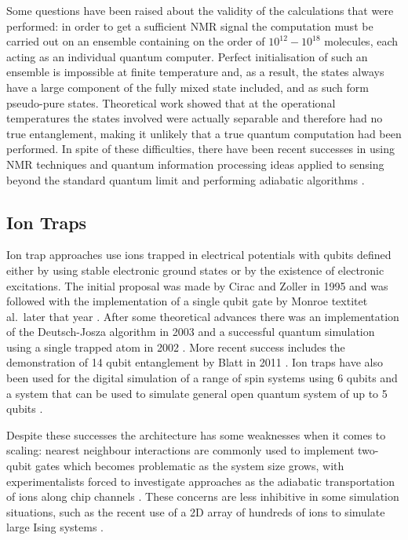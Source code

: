 Some questions have been raised about the validity of the calculations that were performed: in order to get a sufficient NMR signal the computation must be carried out on an ensemble containing on the order of $10^{12} − 10^{18}$ molecules, each acting as an individual quantum computer. Perfect initialisation of such an ensemble is impossible at finite temperature and, as a result, the states always have a large component of the fully mixed state included, and as such form pseudo-pure states. Theoretical work \cite{nmr_pseudo_pure} showed that at the operational temperatures the states involved were actually separable and therefore had no true entanglement, making it unlikely that a true quantum computation had been performed. In spite of these difficulties, there have been recent successes in using NMR techniques and quantum information processing ideas applied to sensing beyond the standard quantum limit \cite{nmr_sensing_09} and performing adiabatic algorithms \cite{nmr_143_factorization}.

\subsection{Ion Traps}

Ion trap approaches use ions trapped in electrical potentials with qubits defined either by using stable electronic ground states or by the existence of electronic excitations. The initial proposal was made by Cirac and Zoller in 1995 \cite{cirac_zoller_ion_trap_proposal_95} and was followed with the implementation of a single qubit gate by Monroe textit{et al}.\ later that year \cite{monroe_ion_trap_gate_95}. After some theoretical advances  \cite{first_ion_trap_wineland_98} there was an implementation of the Deutsch-Josza algorithm in 2003 \cite{ion_trap_deutsch_jozsa_03} and a successful quantum simulation using a single trapped atom in 2002 \cite{ion_trap_simulator_02}. More recent success includes the demonstration of 14 qubit entanglement by Blatt in 2011 \cite{ion_trap_14_qubits}. Ion traps have also been used for the digital simulation of a range of spin systems using 6 qubits \cite{ion_trap_digital_simulator} and a system that can be used to simulate general open quantum system of up to 5 qubits \cite{ion_trap_simulator}.

Despite these successes the architecture has some weaknesses when it comes to scaling: nearest neighbour interactions are commonly used to implement two-qubit gates which becomes problematic as the system size grows, with experimentalists forced to investigate approaches as the adiabatic transportation of ions along chip channels \cite{ion_trap_on_chip}. These concerns are less inhibitive in some simulation situations, such as the recent use of a 2D array of hundreds of ions to simulate large Ising systems \cite{ion_trap_magnetism_simulator}.

